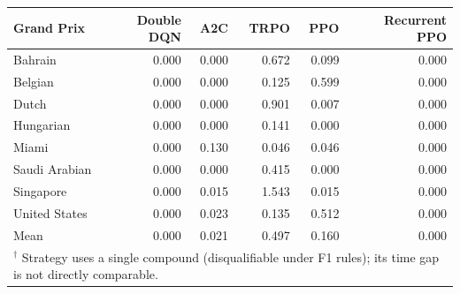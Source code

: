 \begin{tabular}{lrrrrr}
\toprule
Grand Prix & Double DQN & A2C & TRPO & PPO & Recurrent PPO \\
\midrule
Bahrain & 0.000 & 0.000 & 0.672 & 0.099 & 0.000 \\
Belgian & 0.000 & 0.000 & 0.125 & 0.599 & 0.000 \\
Dutch & 0.000 & 0.000 & 0.901 & 0.007 & 0.000 \\
Hungarian & 0.000 & 0.000 & 0.141 & 0.000 & 0.000 \\
Miami & 0.000 & 0.130 & 0.046 & 0.046 & 0.000 \\
Saudi Arabian & 0.000 & 0.000 & 0.415 & 0.000 & 0.000 \\
Singapore & 0.000 & 0.015 & 1.543 & 0.015 & 0.000 \\
United States & 0.000 & 0.023 & 0.135 & 0.512 & 0.000 \\
\midrule
Mean & 0.000 & 0.021 & 0.497 & 0.160 & 0.000 \\
\bottomrule
\multicolumn{6}{l}{\footnotesize $^\dagger$ Strategy uses a single compound (disqualifiable under F1 rules); its time gap is not directly comparable.} \\
\end{tabular}